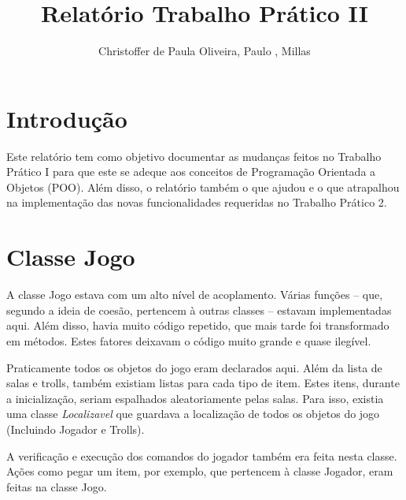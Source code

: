 \documentclass[runningheads,a4paper]{llncs}
\begin{document}
\mainmatter 

\title{Relatório Trabalho Prático II}


\author{Christoffer de Paula Oliveira, Paulo , Millas}



\tocauthor{{}}

\maketitle

\medskip

\begingroup
\let\clearpage\relax
\tableofcontents
{}
\endgroup

\medskip
\medskip

\section*{Introdução}
Este relatório tem como objetivo documentar as mudanças feitos no Trabalho Prático I para que este se adeque aos conceitos de Programação Orientada a Objetos (POO). Além disso, o relatório também o que ajudou e o que atrapalhou na implementação das novas funcionalidades requeridas no Trabalho Prático 2.

\section{Classe Jogo}
A classe Jogo estava com um alto nível de acoplamento. Várias funções -- que, segundo a ideia de coesão, pertencem à outras classes -- estavam implementadas aqui. Além disso, havia muito código repetido, que mais tarde foi transformado em métodos. Estes fatores deixavam o código muito grande e quase ilegível.

Praticamente todos os objetos do jogo eram declarados aqui. Além da lista de salas e trolls, também existiam listas para cada tipo de item. Estes itens, durante a inicialização, seriam espalhados aleatoriamente pelas salas. Para isso, existia uma classe \emph{Localizavel} que guardava a localização de todos os objetos do jogo (Incluindo Jogador e Trolls).

A verificação e execução dos comandos do jogador também era feita nesta classe. Ações como pegar um item, por exemplo, que pertencem à classe Jogador, eram feitas na classe Jogo.
\end{document}

